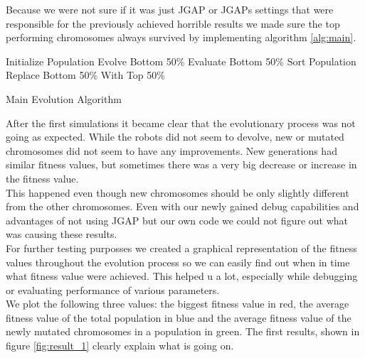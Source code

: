 \documentclass[a4paper,10pt]{article}
\begin{document}
Because we were not sure if it was just JGAP or JGAPs settings that were responsible for the previously achieved horrible results we made sure the top performing chromosomes always survived by implementing algorithm \ref{alg:main}.

\begin{algorithm}
\begin{algorithmic}
\STATE Initialize Population
    \STATE Evolve Bottom 50\%
    \STATE Evaluate Bottom 50\%
    \STATE Sort Population 
    \STATE Replace Bottom 50\% With Top 50\%
\ENDWHILE
\end{algorithmic}
\caption{Main Evolution Algorithm}
\label{alg:main}
\end{algorithm}

After the first simulations it became clear that the evolutionary process was not going as expected. While the robots did not seem to devolve, new or mutated chromosomes did not seem to have any improvements. New generations had similar fitness values, but sometimes there was a very big decrease or increase in the fitness value.\\
This happened even though new chromosomes should be only slightly different from the other chromosomes. Even with our newly gained debug capabilities and advantages of not using JGAP but our own code we could not figure out what was causing these results.\\
For further testing purposses we created a graphical representation of the fitness values throughout the evolution process so we can easily find out when in time what fitness value were achieved. This helped u a lot, especially while debugging or evaluating performance of various parameters.\\

We plot the following three values: the biggest fitness value in red, the average fitness value of the total population in blue and the average fitness value of the newly mutated chromosomes in a population in green. The first results, shown in figure \ref{fig:result_1} clearly explain what is going on.\\
\end{document}
